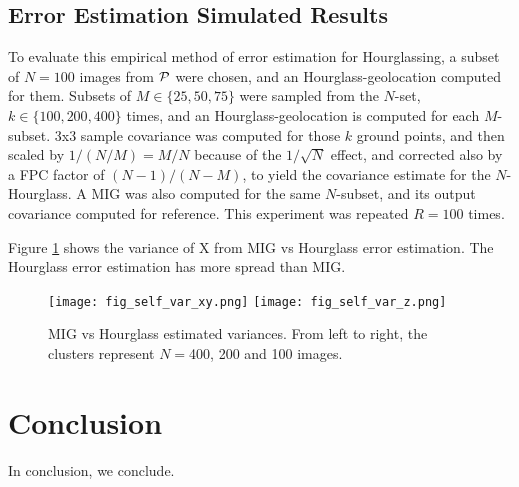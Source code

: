 \documentclass[11pt]{amsart}
\begin{document}
\subsection{\label{hsimulation}Error Estimation Simulated Results}
To evaluate this empirical method of error estimation for Hourglassing, a subset
of $N=100$ images from $\mathcal{P}$ were chosen, and an Hourglass-geolocation
computed for them. Subsets of $M\in\{25,50,75\}$ were sampled from the $N$-set,
$k\in\{100,200,400\}$ times, and an Hourglass-geolocation is computed for each
$M$-subset. 3x3 sample covariance was computed for those $k$ ground points, and
then scaled by $1/(N/M)=M/N$ because of the $1/\sqrt{N}$ effect, and corrected
also by a FPC factor of $(N-1)/(N-M)$, to yield the covariance estimate for the
$N$-Hourglass. A MIG was also computed for the same $N$-subset, and its output
covariance computed for reference. This experiment was repeated $R=100$ times.

Figure \ref{fig:mig_vs_hourglass_var} shows the variance of X from MIG vs
Hourglass error estimation. The Hourglass error estimation has more spread than MIG.

\begin{figure}
\texttt{[image: fig\_self\_var\_xy.png]}
\texttt{[image: fig\_self\_var\_z.png]}
\caption{\label{fig:mig_vs_hourglass_var}MIG vs Hourglass estimated
  variances. From left to right, the clusters represent $N=$400, 200 and 100
  images.}
\end{figure}

\section{Conclusion}
In conclusion, we conclude.
\end{document}
